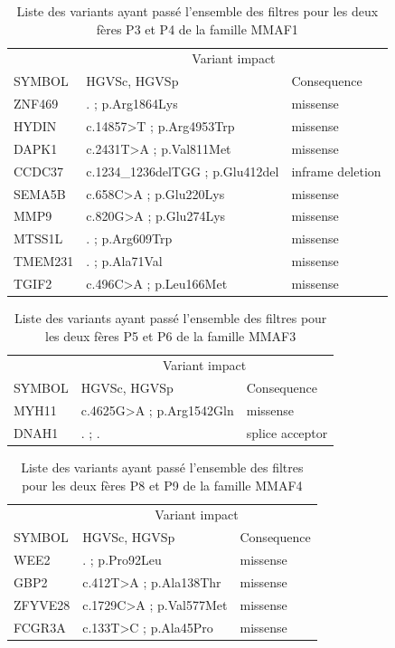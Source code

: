\documentclass[12pt,twoside]{reedthesis}
\theoremstyle{definition}
\theoremstyle{definition}
\theoremstyle{remark}
\begin{document}
  \begin{longtable}[t]{lll}
  \caption{\label{tab:tabmmaf2}Liste des variants ayant passé l'ensemble des filtres pour les deux fères P3 et P4 de la famille MMAF1}\\
  \toprule
  \multicolumn{1}{c}{ } & \multicolumn{2}{c}{Variant impact} \\
  \cmidrule(l{2pt}r{2pt}){2-3}
  SYMBOL & HGVSc, HGVSp & Consequence\\
  \midrule
  ZNF469 & . ; p.Arg1864Lys & missense\\
  HYDIN & c.14857>T ; p.Arg4953Trp & missense\\
  DAPK1 & c.2431T>A ; p.Val811Met & missense\\
  CCDC37 & c.1234\_1236delTGG ; p.Glu412del & inframe deletion\\
  SEMA5B & c.658C>A ; p.Glu220Lys & missense\\
  \addlinespace
  MMP9 & c.820G>A ; p.Glu274Lys & missense\\
  MTSS1L & . ; p.Arg609Trp & missense\\
  TMEM231 & . ; p.Ala71Val & missense\\
  TGIF2 & c.496C>A ; p.Leu166Met & missense\\
  \bottomrule
  \end{longtable}
  
  \begin{longtable}[t]{lll}
  \caption{\label{tab:tabmmaf3}Liste des variants ayant passé l'ensemble des filtres pour les deux fères P5 et P6 de la famille MMAF3}\\
  \toprule
  \multicolumn{1}{c}{ } & \multicolumn{2}{c}{Variant impact} \\
  \cmidrule(l{2pt}r{2pt}){2-3}
  SYMBOL & HGVSc, HGVSp & Consequence\\
  \midrule
  MYH11 & c.4625G>A ; p.Arg1542Gln & missense\\
  DNAH1 & . ; . & splice acceptor\\
  \bottomrule
  \end{longtable}
  
  \begin{longtable}[t]{lll}
  \caption{\label{tab:tabmmaf4}Liste des variants ayant passé l'ensemble des filtres pour les deux fères P8 et P9 de la famille MMAF4}\\
  \toprule
  \multicolumn{1}{c}{ } & \multicolumn{2}{c}{Variant impact} \\
  \cmidrule(l{2pt}r{2pt}){2-3}
  SYMBOL & HGVSc, HGVSp & Consequence\\
  \midrule
  WEE2 & . ; p.Pro92Leu & missense\\
  GBP2 & c.412T>A ; p.Ala138Thr & missense\\
  ZFYVE28 & c.1729C>A ; p.Val577Met & missense\\
  FCGR3A & c.133T>C ; p.Ala45Pro & missense\\
  \bottomrule
  \end{longtable}
  
\end{document}
